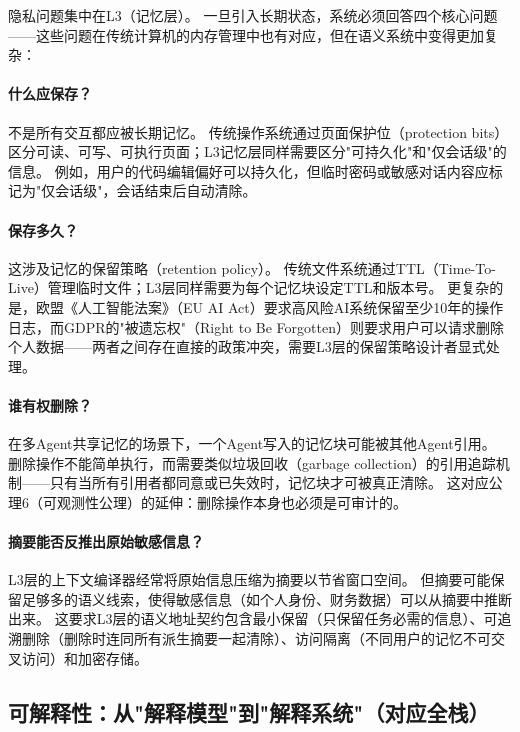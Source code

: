 隐私问题集中在L3（记忆层）。
一旦引入长期状态，系统必须回答四个核心问题——这些问题在传统计算机的内存管理中也有对应，但在语义系统中变得更加复杂：

\paragraph{什么应保存？}
不是所有交互都应被长期记忆。
传统操作系统通过页面保护位（protection bits）区分可读、可写、可执行页面；L3记忆层同样需要区分"可持久化"和"仅会话级"的信息。
例如，用户的代码编辑偏好可以持久化，但临时密码或敏感对话内容应标记为"仅会话级"，会话结束后自动清除。

\paragraph{保存多久？}
这涉及记忆的保留策略（retention policy）。
传统文件系统通过TTL（Time-To-Live）管理临时文件；L3层同样需要为每个记忆块设定TTL和版本号。
更复杂的是，欧盟《人工智能法案》（EU AI Act）要求高风险AI系统保留至少10年的操作日志\cite{euaiact2026}，而GDPR的"被遗忘权"（Right to Be Forgotten）则要求用户可以请求删除个人数据\cite{gdpr_righttoforget}——两者之间存在直接的政策冲突，需要L3层的保留策略设计者显式处理。

\paragraph{谁有权删除？}
在多Agent共享记忆的场景下，一个Agent写入的记忆块可能被其他Agent引用。
删除操作不能简单执行，而需要类似垃圾回收（garbage collection）的引用追踪机制——只有当所有引用者都同意或已失效时，记忆块才可被真正清除。
这对应公理6（可观测性公理）的延伸：删除操作本身也必须是可审计的。

\paragraph{摘要能否反推出原始敏感信息？}
L3层的上下文编译器经常将原始信息压缩为摘要以节省窗口空间。
但摘要可能保留足够多的语义线索，使得敏感信息（如个人身份、财务数据）可以从摘要中推断出来。
这要求L3层的语义地址契约包含最小保留（只保留任务必需的信息）、可追溯删除（删除时连同所有派生摘要一起清除）、访问隔离（不同用户的记忆不可交叉访问）和加密存储\cite{longmemeval2024,navaie2025privacy}。

\subsection{可解释性：从"解释模型"到"解释系统"（对应全栈）}
\label{sec:ethics-explainability}

